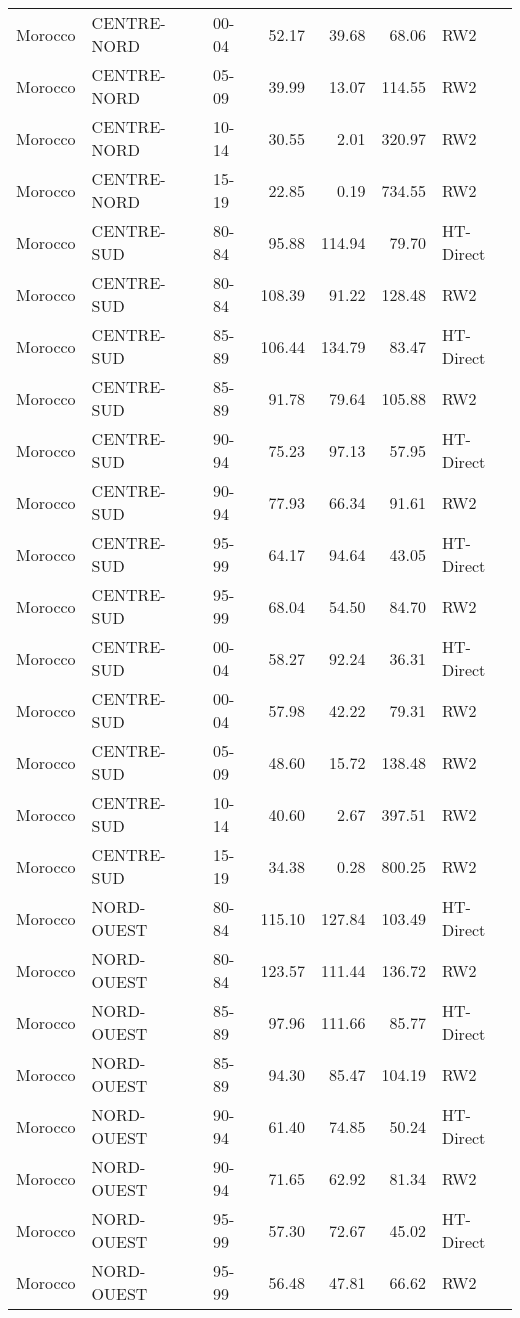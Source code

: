 \begin{longtable}{lllrrrl}
  Morocco & CENTRE-NORD & 00-04 & 52.17 & 39.68 & 68.06 & RW2 \\ 
  Morocco & CENTRE-NORD & 05-09 & 39.99 & 13.07 & 114.55 & RW2 \\ 
  Morocco & CENTRE-NORD & 10-14 & 30.55 & 2.01 & 320.97 & RW2 \\ 
  Morocco & CENTRE-NORD & 15-19 & 22.85 & 0.19 & 734.55 & RW2 \\ 
  Morocco & CENTRE-SUD & 80-84 & 95.88 & 114.94 & 79.70 & HT-Direct \\ 
  Morocco & CENTRE-SUD & 80-84 & 108.39 & 91.22 & 128.48 & RW2 \\ 
  Morocco & CENTRE-SUD & 85-89 & 106.44 & 134.79 & 83.47 & HT-Direct \\ 
  Morocco & CENTRE-SUD & 85-89 & 91.78 & 79.64 & 105.88 & RW2 \\ 
  Morocco & CENTRE-SUD & 90-94 & 75.23 & 97.13 & 57.95 & HT-Direct \\ 
  Morocco & CENTRE-SUD & 90-94 & 77.93 & 66.34 & 91.61 & RW2 \\ 
  Morocco & CENTRE-SUD & 95-99 & 64.17 & 94.64 & 43.05 & HT-Direct \\ 
  Morocco & CENTRE-SUD & 95-99 & 68.04 & 54.50 & 84.70 & RW2 \\ 
  Morocco & CENTRE-SUD & 00-04 & 58.27 & 92.24 & 36.31 & HT-Direct \\ 
  Morocco & CENTRE-SUD & 00-04 & 57.98 & 42.22 & 79.31 & RW2 \\ 
  Morocco & CENTRE-SUD & 05-09 & 48.60 & 15.72 & 138.48 & RW2 \\ 
  Morocco & CENTRE-SUD & 10-14 & 40.60 & 2.67 & 397.51 & RW2 \\ 
  Morocco & CENTRE-SUD & 15-19 & 34.38 & 0.28 & 800.25 & RW2 \\ 
  Morocco & NORD-OUEST & 80-84 & 115.10 & 127.84 & 103.49 & HT-Direct \\ 
  Morocco & NORD-OUEST & 80-84 & 123.57 & 111.44 & 136.72 & RW2 \\ 
  Morocco & NORD-OUEST & 85-89 & 97.96 & 111.66 & 85.77 & HT-Direct \\ 
  Morocco & NORD-OUEST & 85-89 & 94.30 & 85.47 & 104.19 & RW2 \\ 
  Morocco & NORD-OUEST & 90-94 & 61.40 & 74.85 & 50.24 & HT-Direct \\ 
  Morocco & NORD-OUEST & 90-94 & 71.65 & 62.92 & 81.34 & RW2 \\ 
  Morocco & NORD-OUEST & 95-99 & 57.30 & 72.67 & 45.02 & HT-Direct \\ 
  Morocco & NORD-OUEST & 95-99 & 56.48 & 47.81 & 66.62 & RW2 \\ 

\end{longtable}
